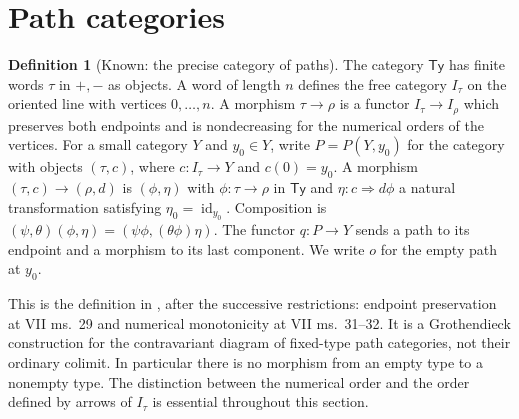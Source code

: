 \documentclass[11pt,a4paper]{article}
\theoremstyle{definition}
\newtheorem{definition}[theorem]{Definition}
\theoremstyle{remark}
\begin{document}

\section{Path categories}

\label{sec:paths}

\begin{definition}[Known: the precise category of paths]\label{E:path-definition}
The category $\mathsf{Ty}$ has finite words $\tau$ in $+,-$ as objects.  A
word of length $n$ defines the free category $I_\tau$ on the oriented line
with vertices $0,\ldots,n$.  A morphism $\tau\to\rho$ is a functor
$I_\tau\to I_\rho$ which preserves both endpoints and is nondecreasing
for the numerical orders of the vertices.  For a small category $Y$ and
$y_0\in Y$, write $P=P(Y,y_0)$ for the category with objects
$(\tau,c)$, where $c:I_\tau\to Y$ and $c(0)=y_0$.  A morphism
$(\tau,c)\to(\rho,d)$ is $(\phi,\eta)$ with
$\phi:\tau\to\rho$ in $\mathsf{Ty}$ and
$\eta:c\Rightarrow d\phi$ a natural transformation satisfying
$\eta_0=\operatorname{id}_{y_0}$.  Composition is
$(\psi,\theta)(\phi,\eta)=(\psi\phi,(\theta\phi)\eta)$.
The functor $q:P\to Y$ sends a path to its endpoint and a morphism to its
last component.  We write $o$ for the empty path at $y_0$.
\end{definition}

This is the definition in \citet[VII \S\S4--5]{GrothendieckDerivateurs}, after the successive restrictions:
endpoint preservation at VII ms.~29 and numerical monotonicity at
VII ms.~31--32.  It is a Grothendieck construction for the contravariant
diagram of fixed-type path categories, not their ordinary colimit.  In
particular there is no morphism from an empty type to a nonempty type.
The distinction between the numerical order and the order defined by
arrows of $I_\tau$ is essential throughout this section.
\end{document}
